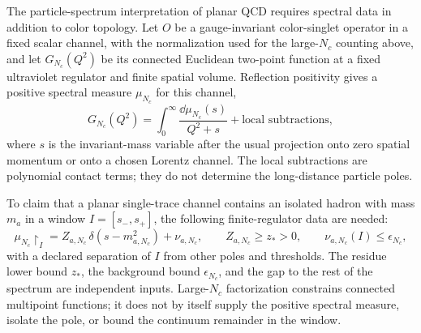 \begin{controlledapproximation}
\label{ca:qcd-large-n-spectral-pole-extraction}
The particle-spectrum interpretation of planar QCD requires spectral data in
addition to color topology.  Let \(O\) be a gauge-invariant
color-singlet operator in a fixed scalar channel, with the normalization used
for the large-\(N_c\) counting above, and let \(G_{N_c}(Q^2)\) be its connected
Euclidean two-point function at a fixed ultraviolet regulator and finite
spatial volume.  Reflection positivity gives a positive spectral measure
\(\mu_{N_c}\) for this channel,
\begin{equation}
  G_{N_c}(Q^2)
  =
  \int_0^\infty
  \frac{\dd\mu_{N_c}(s)}{Q^2+s}
  +
  \text{local subtractions},
  \label{eq:qcd-large-n-spectral-representation}
\end{equation}
where \(s\) is the invariant-mass variable after the usual projection onto
zero spatial momentum or onto a chosen Lorentz channel.  The local
subtractions are polynomial contact terms; they do not determine the
long-distance particle poles.

To claim that a planar single-trace channel contains an isolated hadron with
mass \(m_a\) in a window \(I=[s_-,s_+]\), the following finite-regulator data
are needed:
\begin{equation}
  \mu_{N_c}\!\restriction_I
  =
  Z_{a,N_c}\,\delta(s-m_{a,N_c}^2)
  +
  \nu_{a,N_c},
  \qquad
  Z_{a,N_c}\ge z_*>0,
  \qquad
  \nu_{a,N_c}(I)\le \epsilon_{N_c},
  \label{eq:qcd-large-n-isolated-pole-datum}
\end{equation}
with a declared separation of \(I\) from other poles and thresholds.  The
residue lower bound \(z_*\), the background bound \(\epsilon_{N_c}\), and the
gap to the rest of the spectrum are independent inputs.  Large-\(N_c\)
factorization constrains connected multipoint functions; it does not by
itself supply the positive spectral measure, isolate the pole, or bound the
continuum remainder in the window.


\end{controlledapproximation}
